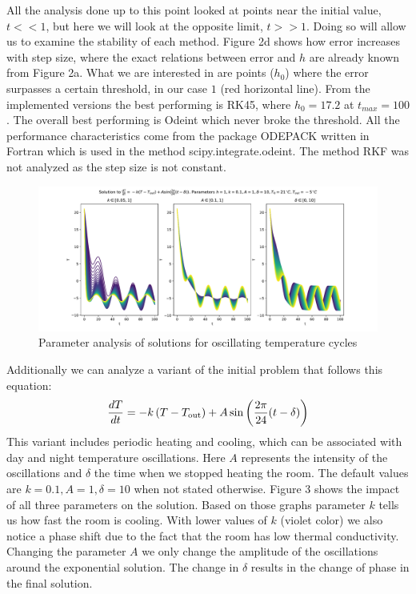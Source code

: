 \documentclass[12pt, a4paper]{article}
\begin{document}
All the analysis done up to this point looked at points near the initial value, $t << 1$, but here we will look at the opposite limit, $t >> 1$. Doing so will allow us to examine the stability of each method. Figure 2d shows how error increases with step size, where the exact relations between error and $h$ are already known from Figure 2a. What we are interested in are points ($h_0$) where the error surpasses a certain threshold, in our case $1$ (red horizontal line). From the implemented versions the best performing is RK45, where $h_0 = 17.2$ at $t_{max} = 100$. The overall best performing is Odeint which never broke the threshold. All the performance characteristics come from the package ODEPACK written in Fortran which is used in the method {\sc scipy.integrate.odeint}. The method RKF was not analyzed as the step size is not constant.

\begin{figure}[hbtp]
  \begin{center}
  \includegraphics[width=13cm]{graphs/f2.pdf}
  \end{center}
  \vspace*{-7mm}
  \caption{Parameter analysis of solutions for oscillating temperature cycles}
\end{figure}

Additionally we can analyze a variant of the initial problem that follows this equation:
\begin{equation}
  \frac{dT}{dt} = - k \left( T-T_\mathrm{out} \right) + A\sin\left( {2\pi\over 24}(t-\delta) \right)
\end{equation}
This variant includes periodic heating and cooling, which can be associated with day and night temperature oscillations. Here $A$ represents the intensity of the oscillations and $\delta$ the time when we stopped heating the room. The default values are $k = 0.1, A = 1, \delta = 10$ when not stated otherwise. Figure 3 shows the impact of all three parameters on the solution. Based on those graphs parameter $k$ tells us how fast the room is cooling. With lower values of $k$ (violet color) we also notice a phase shift due to the fact that the room has low thermal conductivity. Changing the parameter $A$ we only change the amplitude of the oscillations around the exponential solution. The change in $\delta$ results in the change of phase in the final solution.
\end{document}
